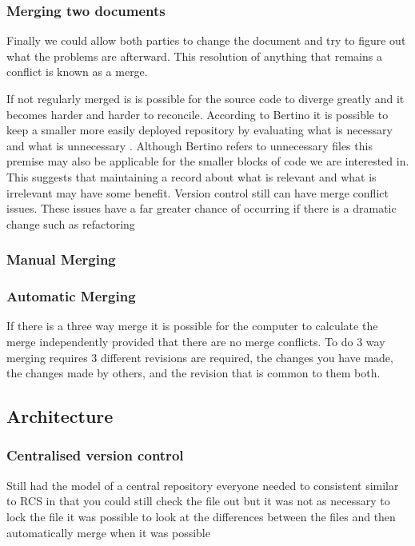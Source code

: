 \subsubsection{Merging two documents}
Finally we could allow both parties to change the document and try to figure out what the problems are afterward.  This resolution of anything that remains a conflict is known as a merge.

If not regularly merged is is possible for the source code to diverge greatly and it becomes harder and harder to reconcile.
 According to Bertino it is possible to keep a smaller more easily deployed repository by evaluating what is necessary and what is unnecessary \cite{Bertino2012}. Although Bertino refers to unnecessary files this premise may also be applicable for the smaller blocks of code we are interested in. This suggests that maintaining a record about what is relevant and what is irrelevant may have some benefit. Version control still can have merge conflict issues. These issues have a far greater chance of occurring if there is a dramatic change such as refactoring
 
\subsubsection{Manual Merging}



\subsubsection{Automatic Merging}
If there is a three way merge it is possible for the computer to calculate the merge independently provided that there are no merge conflicts.
To do 3 way merging requires 3 different revisions are required, the changes you have made, the changes made by others, and the revision that is common to them both.


% 

\subsection{Architecture}
\subsubsection{Centralised version control}
Still had the model of a central repository everyone needed to consistent
similar to RCS in that you could still check the file out but it was not as necessary to lock the file
it was possible to look at the differences between the files and then automatically merge when it was possible

